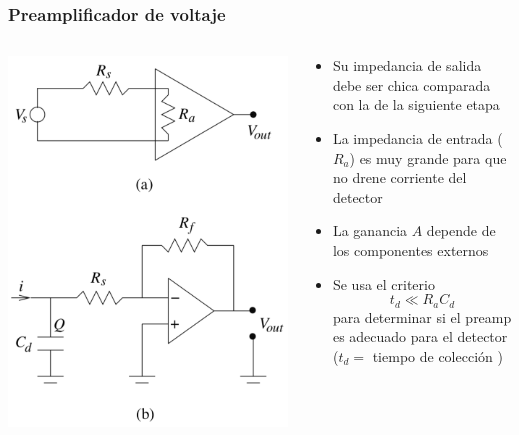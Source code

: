 \documentclass{beamer}
\begin{document}
\begin{frame}
\frametitle{Preamplificador de voltaje}
\begin{columns}
\begin{column}{0.4\textwidth}
\includegraphics[width=\textwidth]{d2/preamp_v}
\end{column}
\begin{column}{0.6\textwidth}
\begin{itemize}
\item Su impedancia de salida debe ser chica comparada con la de la
siguiente etapa 
\item \alert{La impedancia de entrada ($R_a$) es muy grande para que no drene corriente
del detector}
\item La ganancia $A$ depende de los componentes externos
\item Se usa el criterio $$t_d \ll R_aC_d$$ para determinar si el preamp
es adecuado para el detector ($t_d =$ tiempo de colección )
\end{itemize}
\end{column}
\end{columns}
\end{frame}
\end{document}
